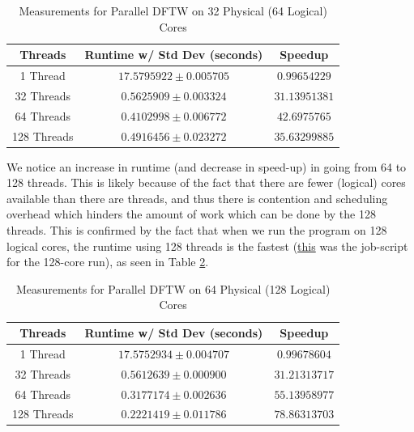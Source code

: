 \documentclass[a4paper,10pt]{article}
\begin{document}
\begin{table}[h!]
\centering
\begin{tabular}{|c|c|c|}
\hline
\textbf{Threads} & \textbf{Runtime w/ Std Dev (seconds)} & \textbf{Speedup} \\
\hline
1 Thread  & $17.5795922 \pm 0.005705$  & $0.99654229$ \\
32 Threads & $0.5625909 \pm 0.003324$ & $31.13951381$ \\
64 Threads & $0.4102998 \pm 0.006772$ & $42.6975765$ \\
128 Threads & $0.4916456 \pm 0.023272$ & $35.63299885$ \\
\hline
\end{tabular}
\caption{Measurements for Parallel DFTW on 32 Physical (64 Logical) Cores}
\label{table:ex4_64_cores}
\end{table}

We notice an increase in runtime (and decrease in speed-up) in going from 64 to 128 threads. This is likely because of the fact that there are fewer (logical) cores available than there are threads, and thus there is contention and scheduling overhead which hinders the amount of work which can be done by the 128 threads. This is confirmed by the fact that when we run the program on 128 logical cores, the runtime using 128 threads is the fastest (\href{https://github.com/paulmyr/DD2356-MethodsHPC/blob/master/3_open_mp/exercise4/job_scripts/dftw_parallel_all_cores_job.sh}{this} was the job-script for the 128-core run), as seen in Table \ref{table:ex4_128_cores}. 

\begin{table}[h!]
\centering
\begin{tabular}{|c|c|c|}
\hline
\textbf{Threads} & \textbf{Runtime w/ Std Dev (seconds)} & \textbf{Speedup} \\
\hline
1 Thread  & $17.5752934 \pm 0.004707$  & $0.99678604$ \\
32 Threads & $0.5612639 \pm 0.000900$ & $31.21313717$ \\
64 Threads & $0.3177174 \pm 0.002636$ & $55.13958977$ \\
128 Threads & $0.2221419 \pm 0.011786$ & $78.86313703$ \\
\hline
\end{tabular}
\caption{Measurements for Parallel DFTW on 64 Physical (128 Logical) Cores}
\label{table:ex4_128_cores}
\end{table}
\end{document}
